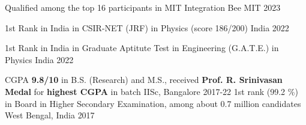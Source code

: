 




\begin{cvhonors}

 \cvhonor
{} %
{Qualified among the top 16 participants in MIT Integration Bee} %
{MIT} %
{2023} %

 \cvhonor
{1st Rank in India} %
{in CSIR-NET (JRF) in Physics (score 186/200)} %
{India} %
{2022} %

 \cvhonor
{1st Rank in India} %
{in Graduate Aptitute Test in Engineering (G.A.T.E.) in Physics} %
{India} %
{2022} %

  \cvhonor
{} %
{CGPA \textbf{\color[HTML]{414141} 9.8/10} in B.S. (Research) and M.S., received \textbf{\color[HTML]{414141} Prof. R. Srinivasan Medal} for \textbf{\color[HTML]{414141} highest CGPA} in batch} %
{IISc, Bangalore} %
{2017-22} %
  \cvhonor
    {1st rank (99.2 \%) in Board} %
    {in Higher Secondary Examination, among about 0.7 million candidates} %
    {West Bengal, India} %
    {2017} %


	 


\end{cvhonors}
